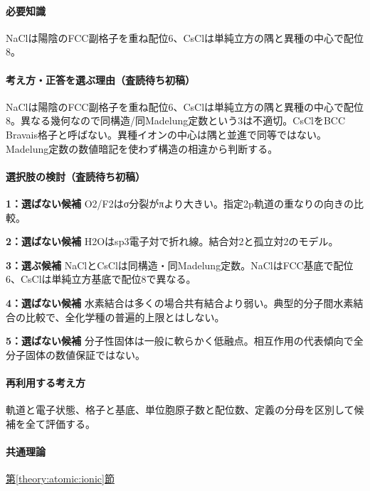 \paragraph{必要知識} NaClは陽陰のFCC副格子を重ね配位6、CsClは単純立方の隅と異種の中心で配位8。

\paragraph{考え方・正答を選ぶ理由（査読待ち初稿）} NaClは陽陰のFCC副格子を重ね配位6、CsClは単純立方の隅と異種の中心で配位8。異なる幾何なので同構造/同Madelung定数という3は不適切。CsClをBCC Bravais格子と呼ばない。異種イオンの中心は隅と並進で同等ではない。Madelung定数の数値暗記を使わず構造の相違から判断する。

\paragraph{選択肢の検討（査読待ち初稿）}\mbox{}\par

\noindent\textbf{1：選ばない候補} O2/F2はσ分裂がπより大きい。指定2p軌道の重なりの向きの比較。\par

\noindent\textbf{2：選ばない候補} H2Oはsp3電子対で折れ線。結合対2と孤立対2のモデル。\par

\noindent\textbf{3：選ぶ候補} NaClとCsClは同構造・同Madelung定数。NaClはFCC基底で配位6、CsClは単純立方基底で配位8で異なる。\par

\noindent\textbf{4：選ばない候補} 水素結合は多くの場合共有結合より弱い。典型的分子間水素結合の比較で、全化学種の普遍的上限とはしない。\par

\noindent\textbf{5：選ばない候補} 分子性固体は一般に軟らかく低融点。相互作用の代表傾向で全分子固体の数値保証ではない。\par

\paragraph{再利用する考え方} 軌道と電子状態、格子と基底、単位胞原子数と配位数、定義の分母を区別して候補を全て評価する。

\paragraph{共通理論} \hyperref[theory:atomic:ionic]{第\ref*{theory:atomic:ionic}節}

